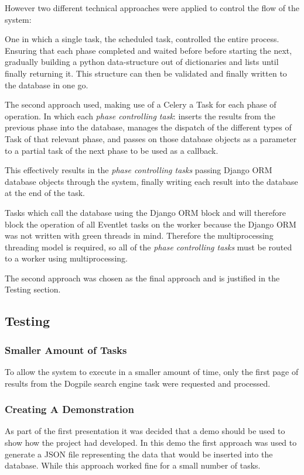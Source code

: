 However two different technical approaches were applied to control the flow of the system:

One in which a single task, the scheduled task, controlled the entire process.  Ensuring that each phase completed and waited before before starting the next, gradually building a python data-structure out of dictionaries and lists until finally returning it.  This structure can then be validated and finally written to the database in one go.

The second approach used, making use of a Celery a Task for each phase of operation.  In which each \emph{phase controlling task}: inserts the results from the previous phase into the database, manages the dispatch of the different types of Task of that relevant phase, and passes on those database objects as a parameter to a partial task of the next phase to be used as a callback. 

This effectively results in the \emph{phase controlling tasks} passing Django ORM database objects through the system, finally writing each result into the database at the end of the task.

Tasks which call the database using the Django ORM block and will therefore block the operation of all Eventlet tasks on the worker because the Django ORM was not written with green threads in mind.  Therefore the multiprocessing threading model is required, so all of the \emph{phase controlling tasks} must be routed to a worker using multiprocessing.

The second approach was chosen as the final approach and is justified in the Testing section.

\subsection{Testing}
\subsubsection{Smaller Amount of Tasks}
To allow the system to execute in a smaller amount of time, only the first page of results from the Dogpile search engine task were requested and processed.

\subsubsection{Creating A Demonstration}
As part of the first presentation it was decided that a demo should be used to show how the project had developed.  In this demo the first approach was used to generate a JSON file representing the data that would be inserted into the database. While this approach worked fine for a small number of tasks.

